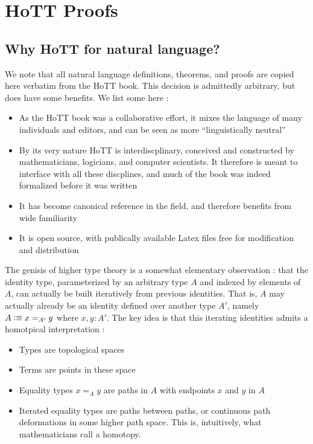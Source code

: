 \section{HoTT Proofs}

\subsection{Why HoTT for natural language?}

We note that all natural language definitions, theorems, and proofs are copied
here verbatim from the HoTT book.  This decision is admittedly arbitrary, but
does have some benefits.  We list some here : 

\begin{itemize}[noitemsep]

\item As the HoTT book was a collaborative effort, it mixes the language of
many individuals and editors, and can be seen as more ``linguistically
neutral''

\item By its very nature HoTT is interdiscplinary, conceived and constructed by
mathematicians, logicians, and computer scientists. It therefore is meant to
interface with all these discplines, and much of the book was indeed formalized
before it was written

\item It has become canonical reference in the field, and therefore benefits
from wide familiarity

\item It is open source, with publically available Latex files free for
modification and distribution

\end{itemize}

The genisis of higher type theory is a somewhat elementary observation : that
the identity type, parameterized by an arbitrary type $A$ and indexed by
elements of $A$, can actually be built iteratively from previous identities.
That is, $A$ may actually already be an identity defined over another type
$A'$, namely $A \vcentcolon\equiv x=_{A'} y$ where $x,y:A'$. The key idea is that this
iterating identities admits a homotpical interpretation : 

\begin{itemize}[noitemsep]

\item Types are topological spaces
\item Terms are points in these space

\item Equality types $x=_{A} y$ are paths in $A$ with endpoints $x$ and $y$ in
$A$

\item Iterated equality types are paths between paths, or continuous path
deformations in some higher path space. This is, intuitively, what
mathematicians call a homotopy.

\end{itemize}

